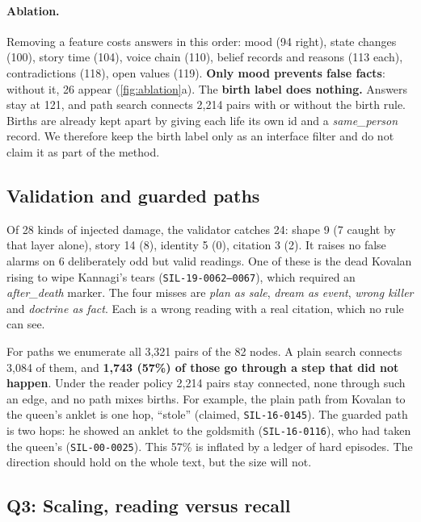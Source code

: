 \documentclass[11pt]{article}
\newcommand{\lid}[1]{\texttt{\small #1}}
\begin{document}
\paragraph{Ablation.} Removing a feature costs answers in this order: mood (94 right), state changes (100), story time (104), voice chain (110), belief records and reasons (113 each), contradictions (118), open values (119). \textbf{Only mood prevents false facts}: without it, 26 appear (\cref{fig:ablation}a). The \textbf{birth label does nothing.} Answers stay at 121, and path search connects 2,214 pairs with or without the birth rule. Births are already kept apart by giving each life its own id and a \emph{same\_person} record. We therefore keep the birth label only as an interface filter and do not claim it as part of the method.

\subsection{Validation and guarded paths}
\label{sec:paths}
Of 28 kinds of injected damage, the validator catches 24: shape 9 (7 caught by that layer alone), story 14 (8), identity 5 (0), citation 3 (2). It raises no false alarms on 6 deliberately odd but valid readings. One of these is the dead Kovalan rising to wipe Kannagi's tears (\lid{SIL-19-0062--0067}), which required an \emph{after\_death} marker. The four misses are \emph{plan as sale}, \emph{dream as event}, \emph{wrong killer} and \emph{doctrine as fact}. Each is a wrong reading with a real citation, which no rule can see.

For paths we enumerate all 3,321 pairs of the 82 nodes. A plain search connects 3,084 of them, and \textbf{1,743 (57\%) of those go through a step that did not happen}. Under the reader policy 2,214 pairs stay connected, none through such an edge, and no path mixes births. For example, the plain path from Kovalan to the queen's anklet is one hop, ``stole'' (claimed, \lid{SIL-16-0145}). The guarded path is two hops: he showed an anklet to the goldsmith (\lid{SIL-16-0116}), who had taken the queen's (\lid{SIL-00-0025}). This 57\% is inflated by a ledger of hard episodes. The direction should hold on the whole text, but the size will not.

\subsection{Q3: Scaling, reading versus recall}
\label{sec:scale}
\end{document}

